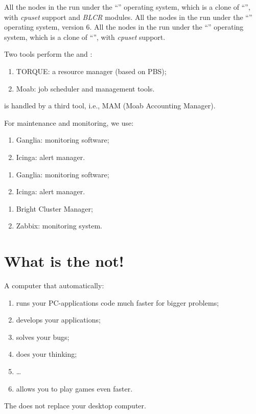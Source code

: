 \ifantwerpen
All the nodes in the \hpc run under the ``\operatingsystemSL'' operating
system, which is a clone of ``\operatingsystemRHEL'', 
with \emph{cpuset} support and \emph{BLCR} modules.
\fi
\ifleuven
All the nodes in the \hpc run under the ``\operatingsystem'' operating system, version 6.
\fi
\ifbrussel
All the nodes in the \hpc run under the ``\operatingsystemSL'' operating
system, which is a clone of ``\operatingsystemRHEL'', 
with \emph{cpuset} support.
\fi

Two tools perform the  and :
\begin{enumerate}
  \item  TORQUE: a resource manager (based on PBS);
  \item  Moab: job scheduler and management tools.
\end{enumerate}
\ifantwerpen
\fi
\ifleuven
{} is handled by a third tool, i.e., MAM (Moab Accounting Manager).
\fi

For maintenance and monitoring, we use:
\ifantwerpen
    \begin{enumerate}
      \item  Ganglia: monitoring software;
      \item  Icinga: alert manager.
    \end{enumerate}
\fi
\ifleuven
    \begin{enumerate}
      \item  Ganglia: monitoring software;
      \item  Icinga: alert manager.
    \end{enumerate}
\fi
\ifbrussel
    \begin{enumerate}
      \item  Bright Cluster Manager;
      \item  Zabbix: monitoring system.
    \end{enumerate}
\fi


\section{What is the \hpc not!}
\label{sec:what-is-the-hpc-not}

A computer that automatically:
\begin{enumerate}
  \item  runs your PC-applications code much faster for bigger problems;
  \item  develops your applications;
  \item  solves your bugs;
  \item  does your thinking;
  \item  \dots
  \item  allows you to play games even faster.
\end{enumerate}
The \hpc does not replace your desktop computer.

